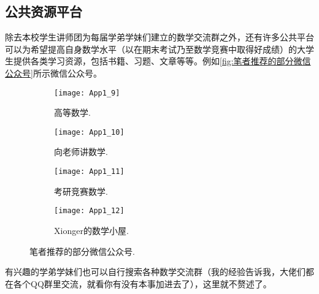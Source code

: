   \subsection{公共资源平台}
    \hspace*{2em}除去本校学生讲师团为每届学弟学妹们建立的数学交流群之外，还有许多公共平台可以为希望提高自身数学水平（以在期末考试乃至数学竞赛中取得好成绩）的大学生提供各类学习资源，包括书籍、习题、文章等等。例如\autoref{fig:笔者推荐的部分微信公众号}所示微信公众号。
    \begin{figure}[!htb]
    \centering
    \hfill
    \begin{subfigure}[b]{.2\textwidth}
      \centering
      \texttt{[image: App1\_9]}
      \caption{高等数学.}
    \end{subfigure}
    \hfill
    \begin{subfigure}[b]{.2\textwidth}
      \centering
      \texttt{[image: App1\_10]}
      \caption{向老师讲数学.}
    \end{subfigure}
    \hfill
    \begin{subfigure}[b]{.2\textwidth}
      \centering
      \texttt{[image: App1\_11]}
      \caption{考研竞赛数学.}
    \end{subfigure}
    \hfill
    \begin{subfigure}[b]{.2\textwidth}
      \centering
      \texttt{[image: App1\_12]}
      \caption{Xionger的数学小屋.}
    \end{subfigure}
    \caption{笔者推荐的部分微信公众号.}\label{fig:笔者推荐的部分微信公众号}
    \end{figure}

    \hspace*{2em}有兴趣的学弟学妹们也可以自行搜索各种数学交流群（我的经验告诉我，大佬们都在各个QQ群里交流，就看你有没有本事加进去了），这里就不赘述了。
